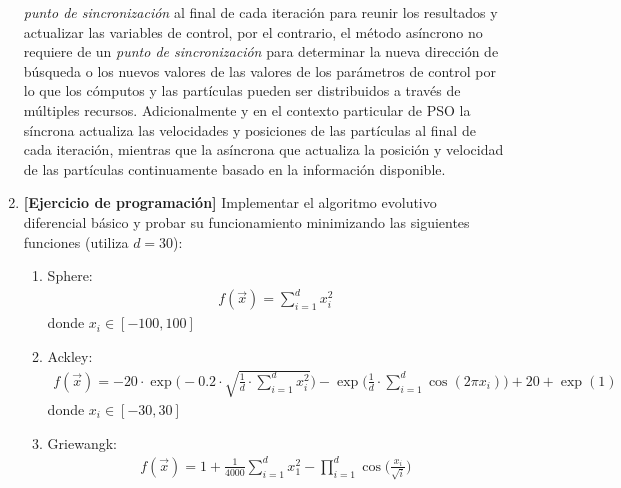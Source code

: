 \documentclass[10pt, letterpaper]{article}
\theoremstyle{definition}
\begin{document}
\begin{enumerate}
        \textit{punto de sincronización} al final de cada iteración para reunir
        los resultados y actualizar las variables de control, por el contrario,
        el método asíncrono no requiere de un \textit{punto de sincronización}
        para determinar la nueva dirección de búsqueda o los nuevos valores de
        las valores de los parámetros de control por lo que los cómputos y las
        partículas pueden ser distribuidos a través de múltiples recursos.
        Adicionalmente y en el contexto particular de PSO la síncrona
        actualiza las velocidades y posiciones de las partículas al final de cada
        iteración, mientras que la asíncrona que actualiza la posición y velocidad
        de las partículas continuamente basado en la información disponible.
    \item \textbf{[Ejercicio de programación]} Implementar el algoritmo evolutivo
    diferencial básico y probar su funcionamiento minimizando las siguientes
    funciones (utiliza $d=30$):
        \begin{enumerate}
            \item Sphere:
                \begin{equation*} \begin{gathered}
                    f(\vec{x}) = \sum_{i=1}^{d} x_i^2
                \end{gathered} \end{equation*}
                donde $x_i \in [-100, 100]$
            \item Ackley:
                \begin{equation*} \begin{gathered}
                    f(\vec{x}) = -20 \cdot \exp \Bigg(
                        -0.2 \cdot
                        \sqrt{\frac{1}{d} \cdot \sum_{i=1}^{d} x_i^2}
                    \Bigg) -
                    \exp \Bigg(
                        \frac{1}{d} \cdot \sum_{i=1}^{d} \cos(2\pi x_i)
                    \Bigg) + 20 + \exp(1)
                \end{gathered} \end{equation*}
                donde $x_i \in [-30, 30]$
            \item Griewangk:
                \begin{equation*} \begin{gathered}
                    f(\vec{x}) = 1 + \frac{1}{4000} \sum_{i=1}^d x_1^2 -
                        \prod_{i=1}^d \cos \Bigg(\frac{x_i}{\sqrt{i}}\Bigg)
                \end{gathered} \end{equation*}

\end{enumerate}
\end{enumerate}
\end{document}
